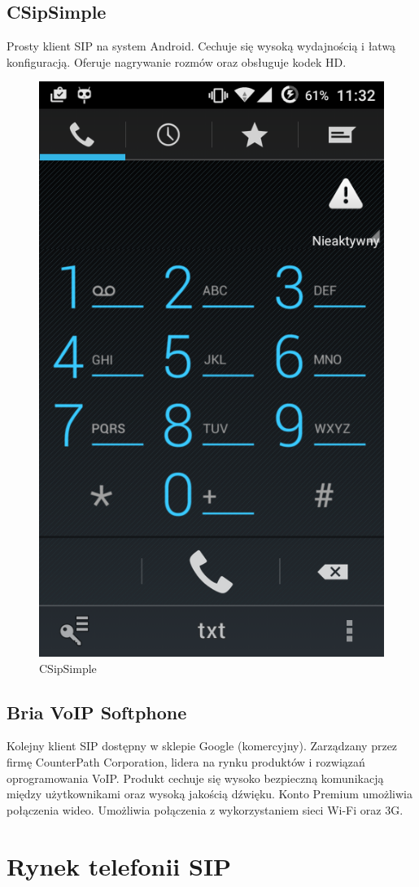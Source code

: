 \subsection{CSipSimple}
Prosty klient SIP na system Android. Cechuje się wysoką wydajnością i  łatwą konfiguracją. Oferuje nagrywanie rozmów oraz obsługuje kodek HD.

 

\begin{figure}[H]
\centering
\includegraphics[width=0.4\linewidth]{Screenshot_2015-09-21-11-32-02}
\caption{CSipSimple}
\label{fig:Screenshot_2015-09-21-11-32-02}
\end{figure}



\subsection{Bria VoIP Softphone}
Kolejny klient SIP dostępny w sklepie Google (komercyjny). Zarządzany przez firmę CounterPath Corporation, lidera na rynku produktów i rozwiązań oprogramowania VoIP. Produkt cechuje się wysoko bezpieczną komunikacją między użytkownikami oraz wysoką jakością dźwięku. Konto Premium umożliwia połączenia wideo. Umożliwia połączenia z wykorzystaniem sieci Wi-Fi oraz 3G. 
\newpage


\section{Rynek telefonii SIP}

